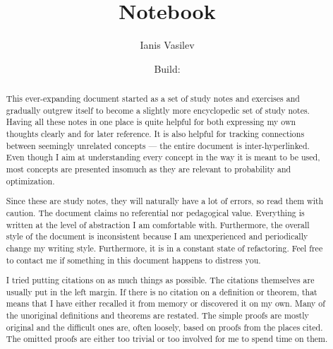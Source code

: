 \documentclass[
  headings=standardclasses,
  bibliography=totocnumbered
]{scrartcl}
\title{Notebook}
\subtitle{\URL{https://github.com/v--/notebook}}
\author{Ianis Vasilev}
\date{Build: }
\begin{document}
\hfuzz=3.5pt
\reversemarginpar
\maketitle

\begin{abstract}
  This ever-expanding document started as a set of study notes and exercises and gradually outgrew itself to become a slightly more encyclopedic set of study notes. Having all these notes in one place is quite helpful for both expressing my own thoughts clearly and for later reference. It is also helpful for tracking connections between seemingly unrelated concepts --- the entire document is inter-hyperlinked. Even though I aim at understanding every concept in the way it is meant to be used, most concepts are presented insomuch as they are relevant to probability and optimization.

  Since these are study notes, they will naturally have a lot of errors, so read them with caution. The document claims no referential nor pedagogical value. Everything is written at the level of abstraction I am comfortable with. Furthermore, the overall style of the document is inconsistent because I am unexperienced and periodically change my writing style. Furthermore, it is in a constant state of refactoring. Feel free to contact me if something in this document happens to distress you.

  I tried putting citations on as much things as possible. The citations themselves are usually put in the left margin. If there is no citation on a definition or theorem, that means that I have either recalled it from memory or discovered it on my own. Many of the unoriginal definitions and theorems are restated. The simple proofs are mostly original and the difficult ones are, often loosely, based on proofs from the places cited. The omitted proofs are either too trivial or too involved for me to spend time on them.
\end{abstract}

\newpage
{}
\tableofcontents
\newpage
















\end{document}
